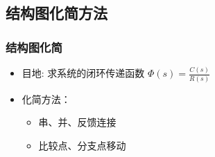 \documentclass{article}
\begin{document}
\subsection{结构图化简方法}
\label{sec-3-2}
\begin{frame}
\frametitle{结构图化简}
\label{sec-3-2-1}

\begin{itemize}
\item <2-> 目地: 求系统的闭环传递函数 $\Phi(s)=\frac{C(s)}{R(s)}$
\item <3-> 化简方法：
\begin{itemize}
\item <4-> 串、并、反馈连接
\item <5-> 比较点、分支点移动
\end{itemize}
\end{itemize}
\end{frame}
\end{document}
